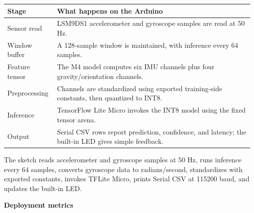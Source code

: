 \documentclass[11pt,a4paper]{article}
\begin{document}
\begin{center}
\small
\begin{tabular}{|p{2.7cm}|p{10.4cm}|}
\hline
\rowcolor{headergray}
\textbf{Stage} & \textbf{What happens on the Arduino}\\
\hline
Sensor read & LSM9DS1 accelerometer and gyroscope samples are read at 50 Hz.\\
\hline
Window buffer & A 128-sample window is maintained, with inference every 64 samples.\\
\hline
Feature tensor & The M4 model computes six IMU channels plus four gravity/orientation channels.\\
\hline
Preprocessing & Channels are standardized using exported training-side constants, then quantized to INT8.\\
\hline
Inference & TensorFlow Lite Micro invokes the INT8 model using the fixed tensor arena.\\
\hline
Output & Serial CSV rows report prediction, confidence, and latency; the built-in LED gives simple feedback.\\
\hline
\end{tabular}
\end{center}
\normalsize

The sketch reads accelerometer and gyroscope samples at 50 Hz, runs inference every 64 samples, converts gyroscope data to radians/second, standardizes with exported constants, invokes TFLite Micro, prints Serial CSV at 115200 baud, and updates the built-in LED.

\textbf{Deployment metrics}
\end{document}
